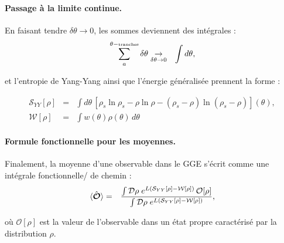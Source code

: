 \paragraph{Passage à la limite continue.}
En faisant tendre $\delta\theta \to 0$, les sommes deviennent des intégrales :
\begin{eqnarray}
\sum_a^{\theta-\mbox{\tiny tranches}}\delta \theta  & \underset{\delta \theta \to 0 }{\rightarrow} & \int d \theta ,	
\end{eqnarray}

et l'entropie de Yang-Yang ainsi que l’énergie généralisée prennent la forme :

\begin{eqnarray}
	\mathcal{S}_{YY}[\rho] & = & \int d \theta  \, [ \rho_s\ln \rho_s - \rho \ln \rho - ( \rho_s - \rho ) \ln ( \rho_s - \rho ) ] (\theta) ,\\
	\mathcal{W}[\rho] & = & \int   w(\theta) \rho(\theta) \, d \theta 		
\end{eqnarray}

\paragraph{Formule fonctionnelle pour les moyennes.}

Finalement, la moyenne d'une observable dans le GGE s’écrit comme une intégrale fonctionnelle/ de chemin :
\begin{eqnarray}
	\langle \hat{\bm{\mathcal{O}}} \rangle & = & \frac{\int \mathcal{D} \rho \; e^{L (\mathcal{S}_{YY}[\rho] - \mathcal{W}[\rho])} \, \mathcal{O}[\rho]}{\int \mathcal{D} \rho \; e^{L (\mathcal{S}_{YY}[\rho] - \mathcal{W}[\rho])}}, \label{chap:TBA:eq:ensemble_average}
\end{eqnarray}

où $\mathcal{O}[\rho]$ est la valeur de l’observable dans un état propre caractérisé par la distribution $\rho$.

	
	

